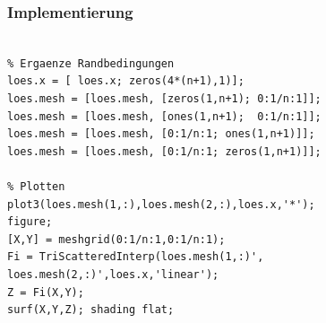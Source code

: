\documentclass[hyperref={xetex}]{beamer}
\begin{document}
%
% 
\begin{frame}[fragile]\frametitle{Implementierung}
\begin{lstlisting}

% Ergaenze Randbedingungen
loes.x = [ loes.x; zeros(4*(n+1),1)];
loes.mesh = [loes.mesh, [zeros(1,n+1); 0:1/n:1]];
loes.mesh = [loes.mesh, [ones(1,n+1);  0:1/n:1]];
loes.mesh = [loes.mesh, [0:1/n:1; ones(1,n+1)]];
loes.mesh = [loes.mesh, [0:1/n:1; zeros(1,n+1)]];

% Plotten
plot3(loes.mesh(1,:),loes.mesh(2,:),loes.x,'*');
figure;
[X,Y] = meshgrid(0:1/n:1,0:1/n:1);
Fi = TriScatteredInterp(loes.mesh(1,:)', loes.mesh(2,:)',loes.x,'linear');
Z = Fi(X,Y);
surf(X,Y,Z); shading flat;
\end{lstlisting}
\end{frame}

\end{document}

